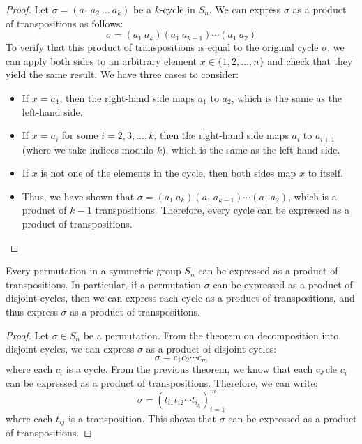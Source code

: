 \documentclass[openany]{book}
\begin{document}
\begin{proof}
    Let \( \sigma = (a_1\ a_2\ \ldots\ a_k) \) be a $k$-cycle in \( S_n \). We can express \( \sigma \) as a product of transpositions as follows:
    \[
    \sigma = (a_1\ a_k)(a_1\ a_{k-1}) \cdots (a_1\ a_2)
    \]
    To verify that this product of transpositions is equal to the original cycle \( \sigma \), we can apply both sides to an arbitrary element \( x \in \{1, 2, \ldots, n\} \) and check that they yield the same result. We have three cases to consider:
    \begin{itemize}
        \item If \( x = a_1 \), then the right-hand side maps \( a_1 \) to \( a_2 \), which is the same as the left-hand side.
        \item If \( x = a_i \) for some \( i = 2, 3, \ldots, k \), then the right-hand side maps \( a_i \) to \( a_{i+1} \) (where we take indices modulo \( k \)), which is the same as the left-hand side.
        \item If \( x \) is not one of the elements in the cycle, then both sides map \( x \) to itself.
        \item Thus, we have shown that \( \sigma = (a_1\ a_k)(a_1\ a_{k-1}) \cdots (a_1\ a_2) \), which is a product of \( k-1 \) transpositions. Therefore, every cycle can be expressed as a product of transpositions.
    \end{itemize}
\end{proof}
\begin{corollary}
    Every permutation in a symmetric group \( S_n \) can be expressed as a product of transpositions. In particular, if a permutation \( \sigma \) can be expressed as a product of disjoint cycles, then we can express each cycle as a product of transpositions, and thus express \( \sigma \) as a product of transpositions.
\end{corollary}
\begin{proof}
    Let \( \sigma \in S_n \) be a permutation. From the theorem on decomposition into disjoint cycles, we can express \( \sigma \) as a product of disjoint cycles:
    \[
    \sigma = c_1 c_2 \cdots c_m
    \]
    where each \( c_i \) is a cycle. From the previous theorem, we know that each cycle \( c_i \) can be expressed as a product of transpositions. Therefore, we can write:
    \[
    \sigma = (t_{i1} t_{i2} \cdots t_{i_{l_i}})_{i=1}^m
    \]
    where each \( t_{ij} \) is a transposition. This shows that \( \sigma \) can be expressed as a product of transpositions.
\end{proof}
\end{document}
